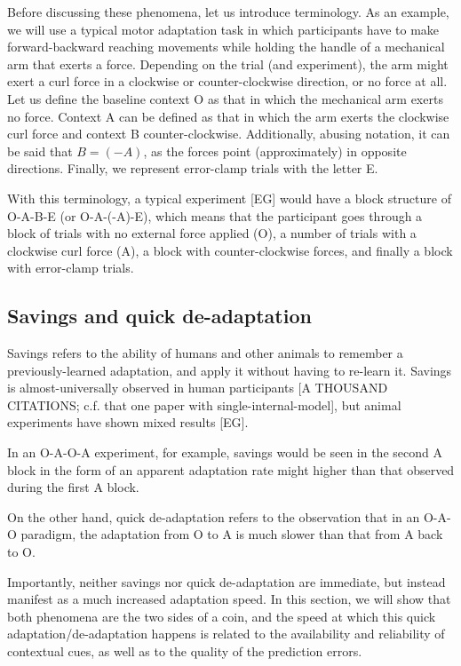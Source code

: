 \documentclass[a4paper,doc,floatsintext,natbib]{apa6}
\begin{document}
Before discussing these phenomena, let us introduce terminology. As an example, we will use a typical motor adaptation task in which participants have to make forward-backward reaching movements while holding the handle of a mechanical arm that exerts a force. Depending on the trial (and experiment), the arm might exert a curl force in a clockwise or counter-clockwise direction, or no force at all. Let us define the baseline context O as that in which the mechanical arm exerts no force. Context A can be defined as that in which the arm exerts the clockwise curl force and context B counter-clockwise. Additionally, abusing notation, it can be said that $B = (-A)$, as the forces point (approximately) in opposite directions. Finally, we represent error-clamp trials with the letter E.

With this terminology, a typical experiment [EG] would have a block structure of O-A-B-E (or O-A-(-A)-E), which means that the participant goes through a block of trials with no external force applied (O), a number of trials with a clockwise curl force (A), a block with counter-clockwise forces, and finally a block with error-clamp trials.

\subsection{Savings and quick de-adaptation}
Savings refers to the ability of humans and other animals to remember a previously-learned adaptation, and apply it without having to re-learn it. Savings is almost-universally observed in human participants [A THOUSAND CITATIONS; c.f. that one paper with single-internal-model], but animal experiments have shown mixed results [EG].

In an O-A-O-A experiment, for example, savings would be seen in the second A block in the form of an apparent adaptation rate might higher than that observed during the first A block.

On the other hand, quick de-adaptation refers to the observation that in an O-A-O paradigm, the adaptation from O to A is much slower than that from A back to O.

Importantly, neither savings nor quick de-adaptation are immediate, but instead manifest as a much increased adaptation speed. In this section, we will show that both phenomena are the two sides of a coin, and the speed at which this quick adaptation/de-adaptation happens is related to the availability and reliability of contextual cues, as well as to the quality of the prediction errors.
\end{document}
